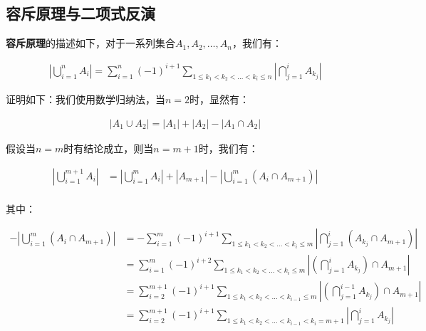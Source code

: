 \documentclass[UTF8]{book}
\begin{document}
\subsection{容斥原理与二项式反演}
\textbf{容斥原理}的描述如下，对于一系列集合$A_1,A_2,\dots,A_n$，我们有：
\begin{large}
    \begin{equation}
        \begin{aligned}
            \left | \bigcup_{i=1}^{n}A_i \right |=\sum_{i=1}^{n}(-1)^{i+1}\sum_{1 \le k_1 < k_2 < \dots < k_i \le n} \left | \bigcap_{j=1}^i A_{k_j} \right |
            \nonumber
        \end{aligned}
    \end{equation}
\end{large}
证明如下：我们使用数学归纳法，当$n=2$时，显然有：
\begin{large}
    \begin{equation}
        \begin{aligned}
            \left | A_1 \cup A_2 \right | = \left | A_1 \right |+\left | A_2 \right |-\left | A_1 \cap A_2 \right |
            \nonumber
        \end{aligned}
    \end{equation}
\end{large}
假设当$n=m$时有结论成立，则当$n=m+1$时，我们有：
\begin{large}
    \begin{equation}
        \begin{aligned}
            \left | \bigcup_{i=1}^{m+1}A_i \right | &= \left | \bigcup_{i=1}^{m}A_i \right | + \left | A_{m+1} \right |-\left | \bigcup_{i=1}^{m} \left (A_i \cap A_{m+1} \right ) \right | \\
            \nonumber
        \end{aligned}
    \end{equation}
\end{large}
其中：
\begin{large}
    \begin{equation}
        \begin{aligned}
            -\left | \bigcup_{i=1}^{m}\left (A_i \cap A_{m+1} \right ) \right | &= -\sum_{i=1}^{m}(-1)^{i+1}\sum_{1 \le k_1 < k_2 < \dots < k_i \le m} \left | \bigcap_{j=1}^i \left (A_{k_j} \cap A_{m+1}\right ) \right | \\
            &= \sum_{i=1}^{m}(-1)^{i+2}\sum_{1 \le k_1 < k_2 < \dots < k_i \le m} \left | \left (\bigcap_{j=1}^i A_{k_j} \right ) \cap A_{m+1} \right | \\
            &= \sum_{i=2}^{m+1}(-1)^{i+1}\sum_{1 \le k_1 < k_2 < \dots < k_{i-1} \le m} \left | \left (\bigcap_{j=1}^{i-1} A_{k_j} \right ) \cap A_{m+1} \right | \\
            &= \sum_{i=2}^{m+1}(-1)^{i+1}\sum_{1 \le k_1 < k_2 < \dots < k_{i-1} < k_i = m+1} \left | \bigcap_{j=1}^{i} A_{k_j}\right |
            \nonumber
        \end{aligned}
    \end{equation}
\end{large}
\end{document}
